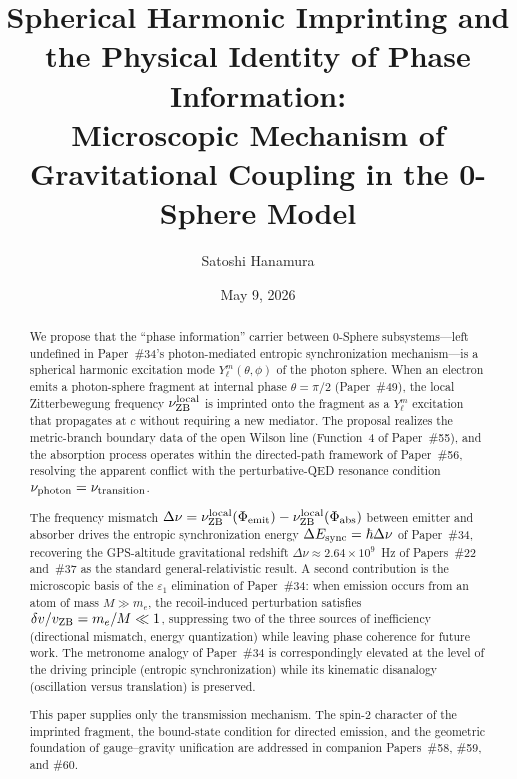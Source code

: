 \documentclass[%
 reprint, amsmath,amssymb, aps, prb, ]{revtex4-2}
\numberwithin{equation}{section}
\newcommand{\iphase}{\theta}
\newcommand{\nuZBl}{\nu_{\text{ZB}}^{\rm local}}
\begin{document}

\title{Spherical Harmonic Imprinting and the Physical Identity of Phase Information:\\
Microscopic Mechanism of Gravitational Coupling in the 0-Sphere Model}

\author{Satoshi Hanamura}
\date{May 9, 2026}

\begin{abstract}
We propose that the ``phase information'' carrier between 0-Sphere subsystems---left undefined in Paper~\#34's photon-mediated entropic synchronization mechanism---is a spherical harmonic excitation mode $Y_\ell^m(\theta,\phi)$ of the photon sphere. When an electron emits a photon-sphere fragment at internal phase $\iphase = \pi/2$ (Paper~\#49), the local Zitterbewegung frequency $\nuZBl$ is imprinted onto the fragment as a $Y_\ell^m$ excitation that propagates at $c$ without requiring a new mediator. The proposal realizes the metric-branch boundary data of the open Wilson line (Function~4 of Paper~\#55), and the absorption process operates within the directed-path framework of Paper~\#56, resolving the apparent conflict with the perturbative-QED resonance condition $\nu_{\rm photon} = \nu_{\rm transition}$.

The frequency mismatch $\Delta\nu = \nuZBl(\Phi_{\rm emit}) - \nuZBl(\Phi_{\rm abs})$ between emitter and absorber drives the entropic synchronization energy $\Delta E_{\rm sync} = \hbar\Delta\nu$ of Paper~\#34, recovering the GPS-altitude gravitational redshift $\Delta\nu \approx 2.64\times 10^9$~Hz of Papers~\#22 and~\#37 as the standard general-relativistic result. A second contribution is the microscopic basis of the $\varepsilon_1$ elimination of Paper~\#34: when emission occurs from an atom of mass $M \gg m_e$, the recoil-induced perturbation satisfies $\delta v / v_{\rm ZB} = m_e/M \ll 1$, suppressing two of the three sources of inefficiency (directional mismatch, energy quantization) while leaving phase coherence for future work. The metronome analogy of Paper~\#34 is correspondingly elevated at the level of the driving principle (entropic synchronization) while its kinematic disanalogy (oscillation versus translation) is preserved.

This paper supplies only the transmission mechanism. The spin-2 character of the imprinted fragment, the bound-state condition for directed emission, and the geometric foundation of gauge--gravity unification are addressed in companion Papers~\#58, \#59, and \#60.
\end{abstract}
\end{document}
